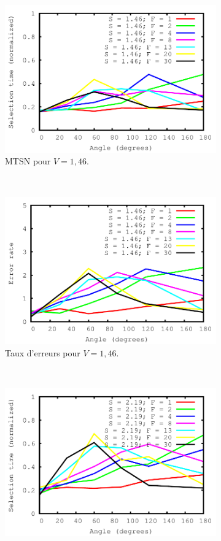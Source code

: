 \begin{figure}[!htb]
\begin{subfigure}[t]{\subImgWlineplot}
			\includegraphics[width=\textwidth]{figures/ch4/angle_speed_1_46_times}
			\caption{MTSN pour $V = 1,46$.}
			\label{fig:aEffect_t_146}
		\end{subfigure}
		~
		\begin{subfigure}[t]{\subImgWlineplot}
			\centering
			\includegraphics[width=\textwidth]{figures/ch4/angle_speed_1_46_errors}
			\caption{Taux d'erreurs pour $V = 1,46$.}
			\label{fig:aEffect_e_146}
		\end{subfigure}
		~
		\begin{subfigure}[t]{\subImgWlineplot}
			\centering
			\includegraphics[width=\textwidth]{figures/ch4/angle_speed_2_19_times}

\end{subfigure}
\end{figure}
